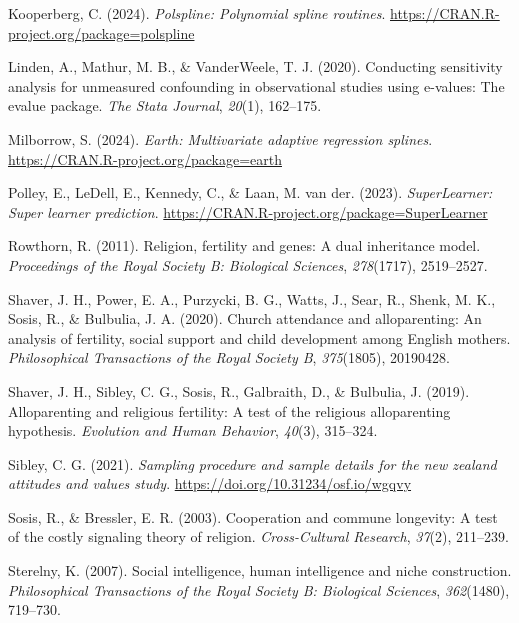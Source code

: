 \documentclass[
  single column]{article}
\newlength{\cslhangindent}
\newenvironment{CSLReferences}[2] %
 {\begin{list}{}{%
  \setlength{\itemindent}{0pt}
  \setlength{\leftmargin}{0pt}
  \setlength{\parsep}{0pt}
  \ifodd #1
   \setlength{\leftmargin}{\cslhangindent}
   \setlength{\itemindent}{-1\cslhangindent}
  \fi
  \setlength{\itemsep}{#2\baselineskip}}}
 {\end{list}}
\begin{document}
\begin{CSLReferences}{1}{0}
Kooperberg, C. (2024). \emph{Polspline: Polynomial spline routines}.
\url{https://CRAN.R-project.org/package=polspline}

Linden, A., Mathur, M. B., \& VanderWeele, T. J. (2020). Conducting
sensitivity analysis for unmeasured confounding in observational studies
using e-values: The evalue package. \emph{The Stata Journal},
\emph{20}(1), 162--175.

Milborrow, S. (2024). \emph{Earth: Multivariate adaptive regression
splines}. \url{https://CRAN.R-project.org/package=earth}

Polley, E., LeDell, E., Kennedy, C., \& Laan, M. van der. (2023).
\emph{SuperLearner: Super learner prediction}.
\url{https://CRAN.R-project.org/package=SuperLearner}

Rowthorn, R. (2011). Religion, fertility and genes: A dual inheritance
model. \emph{Proceedings of the Royal Society B: Biological Sciences},
\emph{278}(1717), 2519--2527.

Shaver, J. H., Power, E. A., Purzycki, B. G., Watts, J., Sear, R.,
Shenk, M. K., Sosis, R., \& Bulbulia, J. A. (2020). Church attendance
and alloparenting: An analysis of fertility, social support and child
development among {E}nglish mothers. \emph{Philosophical Transactions of
the Royal Society B}, \emph{375}(1805), 20190428.

Shaver, J. H., Sibley, C. G., Sosis, R., Galbraith, D., \& Bulbulia, J.
(2019). Alloparenting and religious fertility: A test of the religious
alloparenting hypothesis. \emph{Evolution and Human Behavior},
\emph{40}(3), 315--324.

Sibley, C. G. (2021). \emph{Sampling procedure and sample details for
the new zealand attitudes and values study}.
\url{https://doi.org/10.31234/osf.io/wgqvy}

Sosis, R., \& Bressler, E. R. (2003). Cooperation and commune longevity:
A test of the costly signaling theory of religion. \emph{Cross-Cultural
Research}, \emph{37}(2), 211--239.

Sterelny, K. (2007). Social intelligence, human intelligence and niche
construction. \emph{Philosophical Transactions of the Royal Society B:
Biological Sciences}, \emph{362}(1480), 719--730.


\end{CSLReferences}
\end{document}
